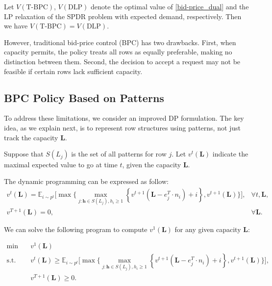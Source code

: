 

Let $V(\text{T-BPC})$, $V(\text{DLP})$ denote the optimal value of \eqref{bid-price_dual} and the LP relaxation of the \textup{SPDR} problem with expected demand, respectively. Then we have $V(\text{T-BPC}) = V(\text{DLP})$.

However, traditional bid-price control (BPC) has two drawbacks. First, when capacity permits, the policy treats all rows as equally preferable, making no distinction between them. Second, the decision to accept a request may not be feasible if certain rows lack sufficient capacity.

\subsection{BPC Policy Based on Patterns}
To address these limitations, we consider an improved DP formulation. The key idea, as we explain next, is to represent row structures using patterns, not just track the capacity $\bm{L}$.

Suppose that $S(L_{j})$ is the set of all patterns for row $j$. Let $v^t(\bm{L})$ indicate the maximal expected value to go at time $t$, given the capacity $\bm{L}$.

The dynamic programming can be expressed as follow:
\begin{equation}
    \begin{array}{lr}
    v^t(\bm{L}) = \mathbb{E}_{i \sim p^t}\Bigg[\max\Big\{\max_{j :\bm{h} \in S(L_{j}), 
    h_{i} \geqslant 1}\left\{v^{t+1}(\bm{L}- e_{j}^{T} \cdot n_{i})+ {i}\right\}, v^{t+1}(\bm{L})\Big\}\Bigg], & \forall t, \bm{L}, \\
    v^{T+1}(\bm{L})=0, & \forall \bm{L}.
    \end{array}
\end{equation}

We can solve the following program to compute $v^1(\bm{L})$ for any given capacity $\bm{L}$:

\begin{equation}\label{dp_bid}
    \begin{aligned}
    \min \quad & v^{1}(\bm{L}) \\
    \mathrm{s.t.} \quad & v^{t}(\bm{L}) \geq \mathbb{E}_{i \sim p^t}\Bigg[\max\Big\{\max_{j :\bm{h} \in S(L_{j}), 
    h_{i} \geqslant 1}\left\{v^{t+1}(\bm{L}- e_{j}^{T} \cdot n_{i})+ {i}\right\}, v^{t+1}(\bm{L})\Big\}\Bigg], \\
    & v^{T+1}(\bm{L}) \geq 0.
    \end{aligned}
\end{equation}

